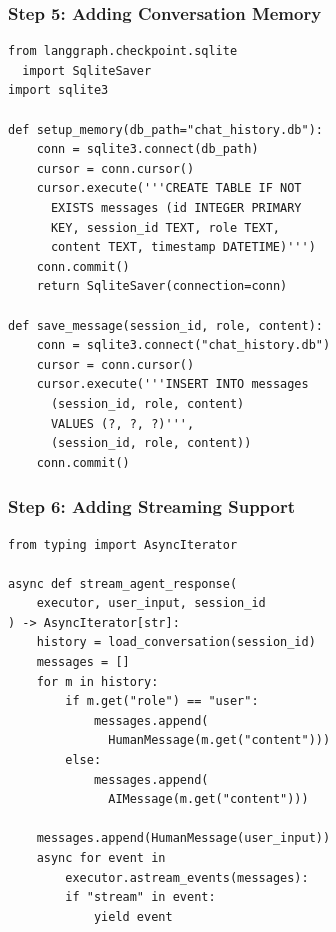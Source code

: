 \documentclass[aspectratio=169,11pt]{beamer}
\begin{document}
\begin{frame}[fragile]
  \frametitle{Step 5: Adding Conversation Memory}

  \begin{lstlisting}
from langgraph.checkpoint.sqlite
  import SqliteSaver
import sqlite3

def setup_memory(db_path="chat_history.db"):
    conn = sqlite3.connect(db_path)
    cursor = conn.cursor()
    cursor.execute('''CREATE TABLE IF NOT
      EXISTS messages (id INTEGER PRIMARY
      KEY, session_id TEXT, role TEXT,
      content TEXT, timestamp DATETIME)''')
    conn.commit()
    return SqliteSaver(connection=conn)

def save_message(session_id, role, content):
    conn = sqlite3.connect("chat_history.db")
    cursor = conn.cursor()
    cursor.execute('''INSERT INTO messages
      (session_id, role, content)
      VALUES (?, ?, ?)''',
      (session_id, role, content))
    conn.commit()
  \end{lstlisting}
\end{frame}

\begin{frame}[fragile]
  \frametitle{Step 6: Adding Streaming Support}

  \begin{lstlisting}
from typing import AsyncIterator

async def stream_agent_response(
    executor, user_input, session_id
) -> AsyncIterator[str]:
    history = load_conversation(session_id)
    messages = []
    for m in history:
        if m.get("role") == "user":
            messages.append(
              HumanMessage(m.get("content")))
        else:
            messages.append(
              AIMessage(m.get("content")))

    messages.append(HumanMessage(user_input))
    async for event in
        executor.astream_events(messages):
        if "stream" in event:
            yield event
  \end{lstlisting}
\end{frame}
\end{document}
